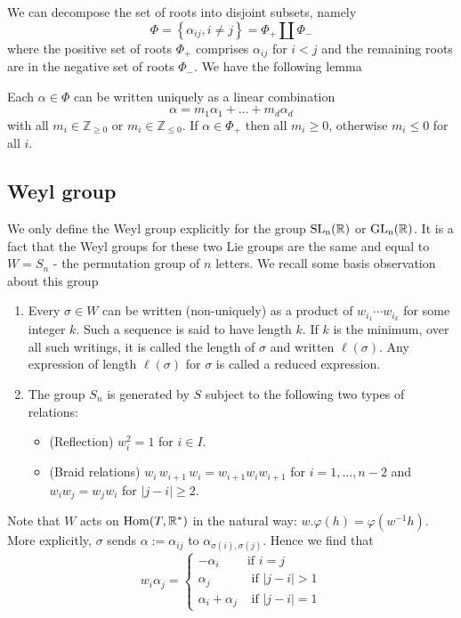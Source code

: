 We can decompose the set of roots into disjoint subsets, namely
\[\Phi = \left\lbrace \alpha_{ij}, i \ne j\right\rbrace = \Phi_+ \coprod \Phi_{-}\]
where the positive set of roots $\Phi_+$  comprises $\alpha_{ij}$ for $i<j$ and the remaining roots are in the negative set of roots $\Phi_{-}$. We have the following lemma
\begin{lemma}\label{linear-comb-of-roots}
    Each $\alpha \in \Phi$ can be written uniquely as a linear combination
    \[\alpha = m_1\alpha_1+\ldots+m_{d}\alpha_{d}\]
    with all $m_i \in \mathbb{Z}_{\ge 0}$ or $m_i \in \mathbb{Z}_{\le 0}$. If $\alpha \in \Phi_+$ then all $m_i \ge 0$, otherwise $m_i \le 0$ for all $i$.
\end{lemma}
\subsection{Weyl group}
We only define the Weyl group explicitly for the group $\operatorname{\text{SL}_n(\mathbb{R})}$ or $\operatorname{\text{GL}_n(\mathbb{R})}$. It is a fact that the Weyl groups for
these two Lie groups are the same and equal to $W = S_n$ - the permutation group of $n$ letters.  We recall some basis
observation about this group
\begin{enumerate}
    \item Every $\sigma \in W$ can be written (non-uniquely) as a product of $w_{i_1} \cdots w_{i_k}$ for some integer $k$. Such a sequence is said to have length $k.$ If $k$ is the minimum, over all such writings, it is called the length of $\sigma$ and written $\ell(\sigma)$. Any expression of length $\ell(\sigma)$ for $\sigma$ is called a reduced expression.

    \item The group $S_n$ is generated by $S$ subject to the following two types of relations:
          \begin{itemize}
              \item (Reflection) $w_i^2=1$ for $i \in I$.
              \item (Braid relations) $w_i \, w_{i+1} \, w_i = w_{i+1}w_i w_{i+1}$ for $i = 1, \ldots, n-2$ and $w_i w_j = w_j w_i$ for $|j -i |\geq 2$.
          \end{itemize}
\end{enumerate}
Note that $W$ acts on $\operatorname{Hom}(T, \mathbb{R}^*)$ in the natural way: $w . \varphi(h) = \varphi(w^{-1} h)$. More explicitly,  $\sigma$ sends $\alpha:= \alpha_{ij}$ to $\alpha_{\sigma(i), \sigma(j)}$. Hence we find that
\[w_i \alpha_j = \begin{cases} - \alpha_i          & \mbox{if } i=j           \\
              \alpha_j            & \mbox{ if } |j - i | > 1 \\
              \alpha_i + \alpha_j & \mbox{ if } |j-i|=1\end{cases} \]



